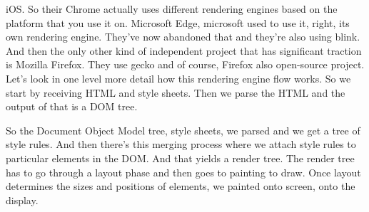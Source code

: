 iOS. So their Chrome actually uses different rendering engines based on the platform that you use it on. Microsoft Edge, microsoft used to use it, right, its own rendering engine. They've now abandoned that and they're also using blink. And then the only other kind of independent project that has significant traction is Mozilla Firefox. They use gecko and of course, Firefox also open-source project. Let's look in one level more detail how this rendering engine flow works. So we start by receiving HTML and style sheets. Then we parse the HTML and the output of that is a DOM tree. 

So the Document Object Model tree, style sheets, we parsed and we get a tree of style rules. And then there's this merging process where we attach style rules to particular elements in the DOM. And that yields a render tree. The render tree has to go through a layout phase and then goes to painting to draw. Once layout determines the sizes and positions of elements, we painted onto screen, onto the display. 

